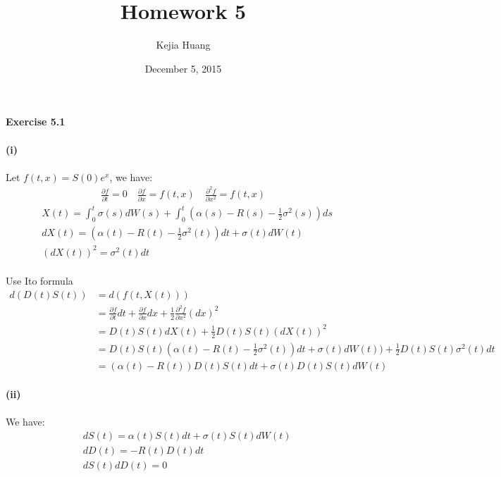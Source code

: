 \documentclass{article}
\begin{document}
\title {Homework 5}
\date {December 5, 2015}
\author{Kejia Huang}
\maketitle
\paragraph{Exercise 5.1}
\paragraph{(i)}
\paragraph{}{Let $f(t,x)=S(0)e^x$, we have:}
\begin{align*}
\frac{\partial f}{\partial t}=0 \quad \frac{\partial f}{\partial x}=f(t,x)\quad \frac{\partial^2 f}{\partial x^2}=f(t,x)
\end{align*}
\begin{align*}
 & X(t)=\int_{0}^{t}\sigma(s)dW(s)+\int_{0}^{t}(\alpha(s)-R(s)-\frac{1}{2}\sigma^2(s))ds\\
 & dX(t)=(\alpha(t)-R(t)-\frac{1}{2}\sigma^2(t))dt+\sigma(t)dW(t)\\
 & (dX(t))^2=\sigma^2(t)dt
\end{align*}
\paragraph{}{Use Ito formula}
\begin{align*}
  d(D(t)S(t)) &= d(f(t,X(t)))\\
  &=\frac{\partial f}{\partial t}dt+\frac{\partial f}{\partial x}dx+\frac{1}{2}\frac{\partial^2 f}{\partial x^2}(dx)^2\\
  &=D(t)S(t)dX(t)+\frac{1}{2}D(t)S(t)(dX(t))^2\\
  &=D(t)S(t)(\alpha(t)-R(t)-\frac{1}{2}\sigma^2(t))dt+\sigma(t)dW(t))+\frac{1}{2}D(t)S(t)\sigma^2(t)dt\\
  &=(\alpha(t)-R(t))D(t)S(t)dt+\sigma(t)D(t)S(t)dW(t)
\end{align*}
\paragraph{(ii)}
\paragraph{}{We have:}
\begin{align*}
 & dS(t)=\alpha(t)S(t)dt+\sigma(t)S(t)dW(t) \\
 & dD(t)=-R(t)D(t)dt\\
 & dS(t)dD(t)=0
\end{align*}
\end{document}
